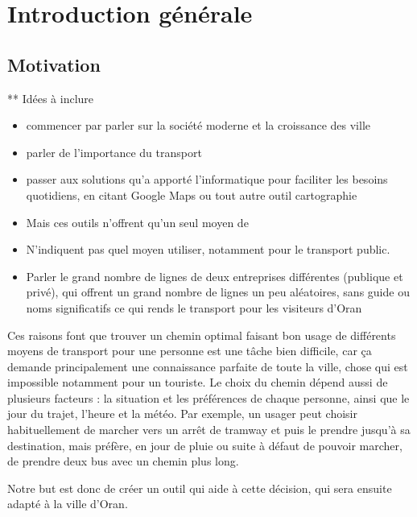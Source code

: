 \chapter{Introduction générale}
	\newpage	
	\section{Motivation}
		
		** Idées à inclure 
		\begin{itemize}
		\item commencer par parler sur la société moderne et la croissance des ville
		\item parler de l'importance du transport
		\item passer aux solutions qu'a apporté l'informatique pour faciliter les besoins quotidiens, en citant Google Maps ou tout autre outil cartographie
		\item Mais ces outils n'offrent qu'un seul moyen de 
		\item N'indiquent pas quel moyen utiliser, notamment pour le transport public.
		\item Parler le grand nombre de lignes de deux entreprises différentes (publique et privé), qui offrent un grand nombre de lignes un peu aléatoires, sans guide ou noms significatifs ce qui rends le transport pour les visiteurs d'Oran
		\end{itemize}


Ces raisons font que trouver un chemin optimal faisant bon usage de différents moyens de transport pour une personne est une tâche bien difficile, car ça demande principalement une connaissance parfaite de toute la ville, chose qui est impossible notamment pour un touriste.
Le choix du chemin dépend aussi de plusieurs facteurs : la situation et les préférences de chaque personne, ainsi que le jour du trajet, l'heure et la météo.
Par exemple, un usager peut choisir habituellement de marcher vers un arrêt de tramway et puis le prendre jusqu'à sa destination, mais préfère, en jour de pluie ou suite à défaut de pouvoir marcher, de prendre deux bus avec un chemin plus long.

Notre but est donc de créer un outil qui aide à cette décision, qui sera ensuite adapté à la ville d’Oran.

